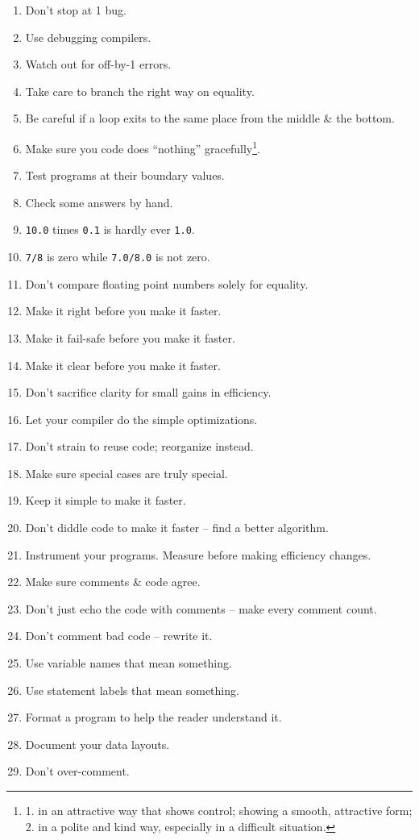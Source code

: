 \documentclass{article}
\begin{document}
\begin{enumerate}
	\item Don't stop at 1 bug.
	\item Use debugging compilers.
	\item Watch out for off-by-1 errors.
	\item Take care to branch the right way on equality.
	\item Be careful if a loop exits to the same place from the middle \& the bottom.
	\item Make sure you code does ``nothing'' gracefully\footnote{1. in an attractive way that shows control; showing a smooth, attractive form; 2. in a polite and kind way, especially in a difficult situation.}.
	\item Test programs at their boundary values.
	\item Check some answers by hand.
	\item {\tt10.0} times {\tt0.1} is hardly ever {\tt1.0}.
	\item {\tt7/8} is zero while {\tt7.0/8.0} is not zero.
	\item Don't compare floating point numbers solely for equality.
	\item Make it right before you make it faster.
	\item Make it fail-safe before you make it faster.
	\item Make it clear before you make it faster.
	\item Don't sacrifice clarity for small gains in efficiency.
	\item Let your compiler do the simple optimizations.
	\item Don't strain to reuse code; reorganize instead.
	\item Make sure special cases are truly special.
	\item Keep it simple to make it faster.
	\item Don't diddle code to make it faster -- find a better algorithm.
	\item Instrument your programs. Measure before making efficiency changes.
	\item Make sure comments \& code agree.
	\item Don't just echo the code with comments -- make every comment count.
	\item Don't comment bad code -- rewrite it.
	\item Use variable names that mean something.
	\item Use statement labels that mean something.
	\item Format a program to help the reader understand it.
	\item Document your data layouts.
	\item Don't over-comment.
\end{enumerate}
\end{document}
